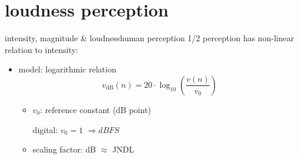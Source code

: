     \section[perception]{loudness perception}
        \begin{frame}{intensity, magnitude \& loudness}{human perception 1/2}
            perception has non-linear relation to intensity:
            \begin{itemize}
                \item	model: logarithmic relation
                    \begin{equation*}
                        v_\mathrm{dB}(n) = 20\cdot\log_{10}\left(\frac{v(n)}{v_0}\right)
                    \end{equation*}
        
                    \pause
                    \begin{itemize}
                        \item	$v_0$: reference constant (\unit[0]{dB} point)
                        
                                digital: $v_0 = 1$ $\Rightarrow \unit{dBFS}$
                        \pause
                        \item	scaling	factor: \unit[1]{dB} $\approx$ JNDL
                    \end{itemize}
            \end{itemize}
        \end{frame}
        
